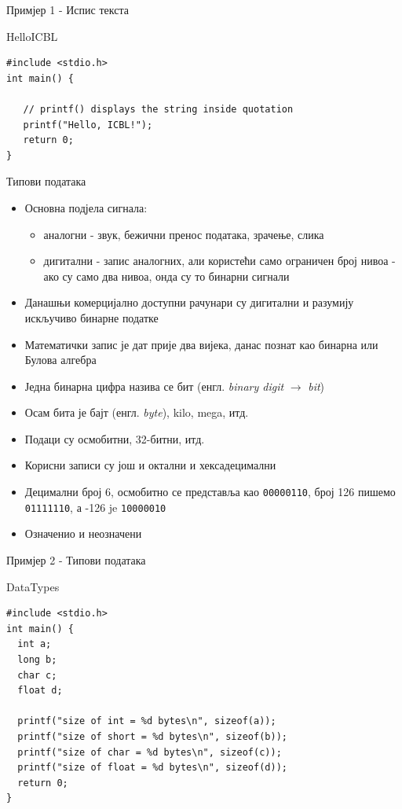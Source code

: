 \documentclass{beamer}
\begin{document}
\begin{frame}[fragile]{Примјер 1 - Испис текста}
\begin{block}{HelloICBL}
\begin{lstlisting}
#include <stdio.h>
int main() {

   // printf() displays the string inside quotation
   printf("Hello, ICBL!");
   return 0;
}
\end{lstlisting}
\end{block}

\end{frame}

\begin{frame}{Типови података}
\begin{itemize}
    \item Основна подјела сигнала:
    \begin{itemize}
        \item аналогни - звук, бежични пренос података, зрачење, слика
        \item дигитални - запис аналогних, али користећи само ограничен број нивоа - ако су само два нивоа, онда су то бинарни сигнали
    \end{itemize}
    \item Данашњи комерцијално доступни рачунари су дигитални и разумију искључиво бинарне податке
    \item Математички запис је дат прије два вијека, данас познат као бинарна или Булова алгебра
    \item Једна бинарна цифра назива се бит (енгл. \textit{binary digit} $\rightarrow$ \textit{bit})
    \item Осам бита је бајт (енгл. \textit{byte}), kilo, mega, итд.
    \item Подаци су осмобитни, 32-битни, итд.
    \item Корисни записи су још и октални и хексадецимални
    \item Децимални број 6, осмобитно се представља као \texttt{00000110}, број 126 пишемо \texttt{01111110}, а -126 je \texttt{10000010}
    \item Означенио и неозначени
\end{itemize}
\end{frame}

\begin{frame}[fragile]{Примјер 2 - Типови података}
\begin{block}{DataTypes}
\begin{lstlisting}
#include <stdio.h>      
int main() {
  int a;
  long b;
  char c;
  float d;

  printf("size of int = %d bytes\n", sizeof(a));
  printf("size of short = %d bytes\n", sizeof(b));
  printf("size of char = %d bytes\n", sizeof(c));
  printf("size of float = %d bytes\n", sizeof(d));
  return 0;
}
\end{lstlisting}
\end{block}
\end{frame}
\end{document}
